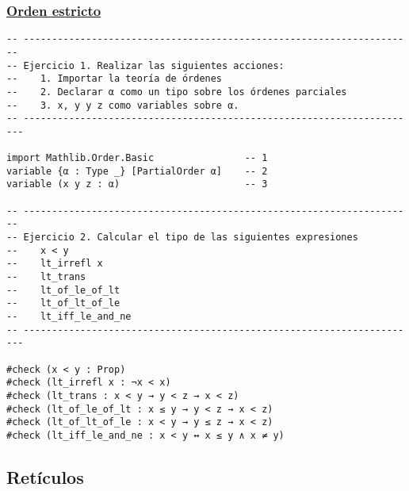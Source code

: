 \subsubsection{\href{./src/Basicos/Orden\_estricto.lean}{Orden estricto}}
\label{sec:orgdce4d4c}
\begin{verbatim}
-- ---------------------------------------------------------------------
-- Ejercicio 1. Realizar las siguientes acciones:
--    1. Importar la teoría de órdenes
--    2. Declarar α como un tipo sobre los órdenes parciales
--    3. x, y y z como variables sobre α.
-- ----------------------------------------------------------------------

import Mathlib.Order.Basic                -- 1
variable {α : Type _} [PartialOrder α]    -- 2
variable (x y z : α)                      -- 3

-- ---------------------------------------------------------------------
-- Ejercicio 2. Calcular el tipo de las siguientes expresiones
--    x < y
--    lt_irrefl x
--    lt_trans
--    lt_of_le_of_lt
--    lt_of_lt_of_le
--    lt_iff_le_and_ne
-- ----------------------------------------------------------------------

#check (x < y : Prop)
#check (lt_irrefl x : ¬x < x)
#check (lt_trans : x < y → y < z → x < z)
#check (lt_of_le_of_lt : x ≤ y → y < z → x < z)
#check (lt_of_lt_of_le : x < y → y ≤ z → x < z)
#check (lt_iff_le_and_ne : x < y ↔ x ≤ y ∧ x ≠ y)
\end{verbatim}

\subsection{Retículos}
\label{sec:org9c0aefb}


